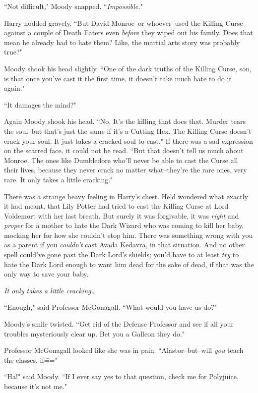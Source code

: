 ``Not difficult," Moody snapped. ``\emph{Impossible.}"

Harry nodded gravely. ``But David Monroe\---or whoever\---used the Killing Curse against a couple of Death Eaters even \emph{before} they wiped out his family. Does that mean he already had to hate them? Like, the martial arts story was probably true?"

Moody shook his head slightly. ``One of the dark truths of the Killing Curse, son, is that once you've cast it the first time, it doesn't take much hate to do it again."

``It damages the mind?"

Again Moody shook his head. ``No. It's the killing that does that. Murder tears the soul\---but that's just the same if it's a Cutting Hex. The Killing Curse doesn't crack your soul. It just takes a cracked soul to cast." If there was a sad expression on the scarred face, it could not be read. ``But that doesn't tell us much about Monroe. The ones like Dumbledore who'll never be able to cast the Curse all their lives, because they never crack no matter what\---they're the rare ones, very rare. It only takes a little cracking."

There was a strange heavy feeling in Harry's chest. He'd wondered what exactly it had meant, that Lily Potter had tried to cast the Killing Curse at Lord Voldemort with her last breath. But surely it was forgivable, it was \emph{right} and \emph{proper} for a mother to hate the Dark Wizard who was coming to kill her baby, mocking her for how she couldn't stop him. There was something wrong with you as a parent if you \emph{couldn't} cast Avada Kedavra, in that situation. And no other spell could've gone past the Dark Lord's shields; you'd have to at least \emph{try} to hate the Dark Lord enough to want him dead for the sake of dead, if that was the only way to save your baby.

\emph{It only takes a little cracking{\ldots}}

``Enough," said Professor McGonagall. ``What would you have us do?"

Moody's smile twisted. ``Get rid of the Defense Professor and see if all your troubles mysteriously clear up. Bet you a Galleon they do."

Professor McGonagall looked like she was in pain. ``Alastor\---but\---will \emph{you} teach the classes, if\==="

``Ha!" said Moody. ``If I ever say yes to that question, check me for Polyjuice, because it's not me."

